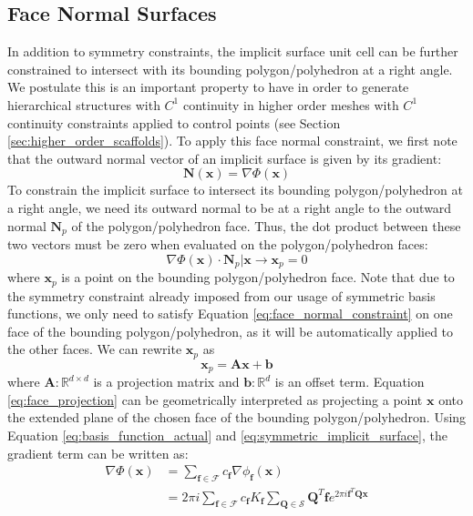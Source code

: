 \documentclass[acmtog]{acmart}
\begin{document}
\subsection{Face Normal Surfaces}
\label{sec:face_normal_surfaces}

In addition to symmetry constraints, the implicit surface unit cell can be further constrained to intersect with its bounding polygon/polyhedron at a right angle. We postulate this is an important property to have in order to generate hierarchical structures with $C^1$ continuity in higher order meshes with $C^1$ continuity constraints applied to control points (see Section \ref{sec:higher_order_scaffolds}). To apply this face normal constraint, we first note that the outward normal vector of an implicit surface is given by its gradient:
%
\begin{equation}
  \mathbf{N}(\mathbf{x}) = \nabla \Phi(\mathbf{x})
\end{equation}
%
To constrain the implicit surface to intersect its bounding polygon/polyhedron at a right angle, we need its outward normal to be at a right angle to the outward normal $\mathbf{N}_p$ of the polygon/polyhedron face. Thus, the dot product between these two vectors must be zero when evaluated on the polygon/polyhedron faces:
%
\begin{equation}
  \label{eq:face_normal_constraint}
  \nabla \Phi(\mathbf{x}) \cdot \mathbf{N}_p \rvert \mathbf{x} \rightarrow \mathbf{x}_p = 0
\end{equation}
%
where $\mathbf{x}_p$ is a point on the bounding polygon/polyhedron face. Note that due to the symmetry constraint already imposed from our usage of symmetric basis functions, we only need to satisfy Equation \ref{eq:face_normal_constraint} on one face of the bounding polygon/polyhedron, as it will be automatically applied to the other faces. We can rewrite $\mathbf{x}_p$ as
%
\begin{equation}
  \label{eq:face_projection}
  \mathbf{x}_p = \mathbf{A} \mathbf{x} + \mathbf{b}
\end{equation}
%
where $\mathbf{A} : \mathbb{R}^{d \times d}$ is a projection matrix and $\mathbf{b} : \mathbb{R}^d $ is an offset term. Equation \ref{eq:face_projection} can be geometrically interpreted as projecting a point $\mathbf{x}$ onto the extended plane of the chosen face of the bounding polygon/polyhedron. Using Equation \ref{eq:basis_function_actual} and \ref{eq:symmetric_implicit_surface}, the gradient term can be written as:
%
\begin{equation}
  \begin{split}
    \nabla \Phi(\mathbf{x}) &= \sum\limits_{\mathbf{f} \in \mathcal{F}} c_{\mathbf{f}} \nabla \phi_{\mathbf{f}}(\mathbf{x}) \\
    &= 2 \pi i \sum\limits_{\mathbf{f} \in \mathcal{F}} c_{\mathbf{f}} K_{\mathbf{f}} \sum\limits_{\mathbf{Q} \in \mathcal{S}} \mathbf{Q}^T \mathbf{f} e^{2 \pi i \mathbf{f}^T \mathbf{Q} \mathbf{x}}
  \end{split}
\end{equation}
%
\end{document}
